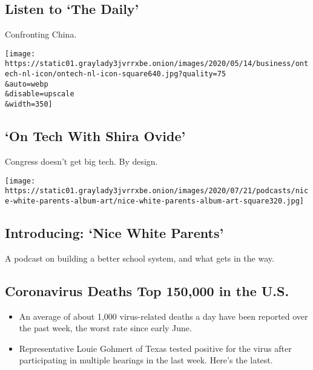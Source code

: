 \href{/2020/07/29/podcasts/the-daily/china-trump-foreign-policy.html}{}

\hypertarget{listen-to-the-daily}{%
\subsection{Listen to `The Daily'}\label{listen-to-the-daily}}

Confronting China.

\href{/2020/07/29/technology/congress-big-tech.html}{}

\texttt{[image: https://static01.graylady3jvrrxbe.onion/images/2020/05/14/business/ontech-nl-icon/ontech-nl-icon-square640.jpg?quality=75\\\&auto=webp\\\&disable=upscale\\\&width=350]}

\href{/2020/07/29/technology/congress-big-tech.html}{}

\hypertarget{on-tech-with-shira-ovide}{%
\subsection{`On Tech With Shira Ovide'}\label{on-tech-with-shira-ovide}}

Congress doesn't get big tech. By design.

\href{/2020/07/23/podcasts/nice-white-parents-serial.html}{}

\texttt{[image: https://static01.graylady3jvrrxbe.onion/images/2020/07/21/podcasts/nice-white-parents-album-art/nice-white-parents-album-art-square320.jpg]}

\href{/2020/07/23/podcasts/nice-white-parents-serial.html}{}

\hypertarget{introducing-nice-white-parents}{%
\subsection{Introducing: `Nice White
Parents'}\label{introducing-nice-white-parents}}

A podcast on building a better school system, and what gets in the way.

\href{/2020/07/29/world/coronavirus-covid-19.html}{}

\hypertarget{coronavirus-deaths-top-150000-in-the-us}{%
\subsection{Coronavirus Deaths Top 150,000 in the
U.S.}\label{coronavirus-deaths-top-150000-in-the-us}}

\begin{itemize}
\tightlist
\item
  An average of about 1,000 virus-related deaths a day have been
  reported over the past week, the worst rate since early June.
\item
  Representative Louie Gohmert of Texas tested positive for the virus
  after participating in multiple hearings in the last week. Here's the
  latest.
\end{itemize}

